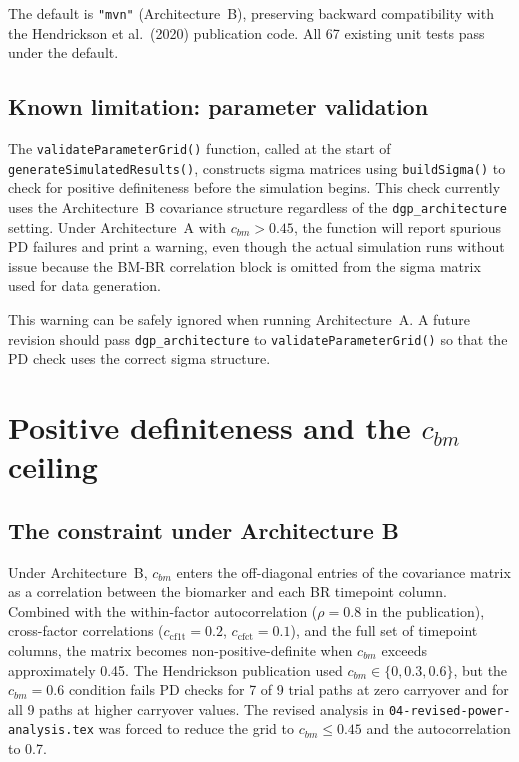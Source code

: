 \documentclass[11pt]{article}
\begin{document}
The default is \texttt{"mvn"} (Architecture~B), preserving
backward compatibility with the Hendrickson et al.\ (2020)
publication code. All 67 existing unit tests pass under the
default.

\subsection{Known limitation: parameter validation}

The \texttt{validateParameterGrid()} function, called at the
start of \texttt{generateSimulatedResults()}, constructs
sigma matrices using \texttt{buildSigma()} to check for
positive definiteness before the simulation begins. This
check currently uses the Architecture~B covariance structure
regardless of the \texttt{dgp\_architecture} setting. Under
Architecture~A with $c_{bm} > 0.45$, the function will
report spurious PD failures and print a warning, even though
the actual simulation runs without issue because the BM-BR
correlation block is omitted from the sigma matrix used for
data generation.

This warning can be safely ignored when running
Architecture~A. A future revision should pass
\texttt{dgp\_architecture} to
\texttt{validateParameterGrid()} so that the PD check uses
the correct sigma structure.

\section{Positive definiteness and the $c_{bm}$ ceiling}

\subsection{The constraint under Architecture B}

Under Architecture~B, $c_{bm}$ enters the off-diagonal
entries of the covariance matrix as a correlation between the
biomarker and each BR timepoint column. Combined with the
within-factor autocorrelation ($\rho = 0.8$ in the
publication), cross-factor correlations ($c_{\text{cf1t}} =
0.2$, $c_{\text{cfct}} = 0.1$), and the full set of
timepoint columns, the matrix becomes non-positive-definite
when $c_{bm}$ exceeds approximately 0.45. The Hendrickson
publication used $c_{bm} \in \{0, 0.3, 0.6\}$, but the
$c_{bm} = 0.6$ condition fails PD checks for 7 of 9 trial
paths at zero carryover and for all 9 paths at higher
carryover values. The revised analysis in
\texttt{04-revised-power-analysis.tex} was forced to reduce the
grid to $c_{bm} \leq 0.45$ and the autocorrelation to 0.7.
\end{document}
